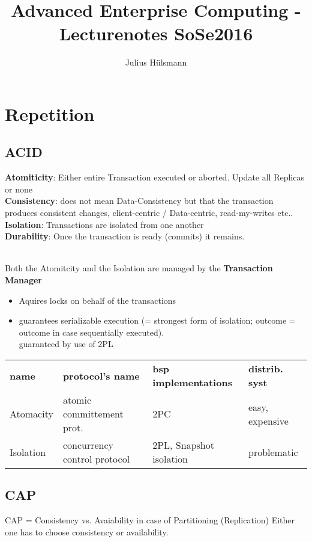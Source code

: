 \documentclass[a4paper,12pt]{article}%
\title{Advanced Enterprise Computing - Lecturenotes SoSe2016}
\author{Julius Hülsmann}
\begin{document}
  \maketitle
  \tableofcontents
  \newpage

\section{Repetition}
\subsection{ACID}

{\bf Atomiticity}: Either  entire Transaction  executed or aborted. Update all Replicas or none\\
{\bf Consistency}: does not mean Data-Consistency but that the transaction produces consistent changes, client-centric / Data-centric, read-my-writes etc..\\
{\bf Isolation}: Transactions are isolated from one another\\
{\bf Durability}: Once the transaction is ready (commits) it remains.

~\\
Both the Atomitcity and the Isolation are managed by the {\bf Transaction Manager}
\begin{itemize}
 \item Aquires locks on behalf of the transactions
 \item guarantees serializable execution (= strongest form of isolation; outcome = outcome in case sequentially executed). \\
 guaranteed by use of 2PL
\end{itemize}

\begin{table}[h]
 \centering
\begin{tabular}{llll}
\rowcolor[HTML]{ECF4FF} 
\textbf{name} & \textbf{protocol's name}     & \textbf{bsp implementations}  & \textbf{distrib. syst} \\
\rowcolor[HTML]{F7F7F7} 
Atomacity     & atomic committement prot. & 2PC        & easy, expensive                          \\
\rowcolor[HTML]{EFEFEF} 
Isolation     & concurrency control protocol & 2PL, Snapshot isolation   & problematic          
\end{tabular}
\end{table}


\subsection{CAP}
CAP = Consistency vs. Avaiability in case of Partitioning (Replication) Either one has to choose consistency or availability.
\end{document}
